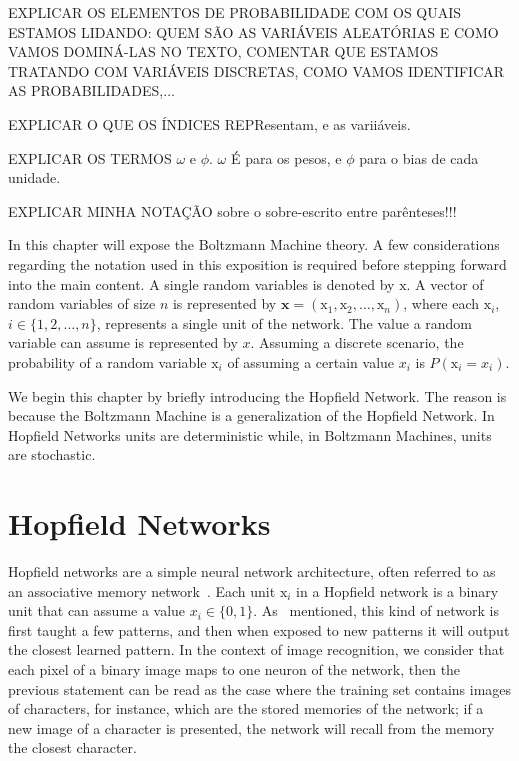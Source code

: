EXPLICAR OS ELEMENTOS DE PROBABILIDADE COM OS QUAIS ESTAMOS LIDANDO:%
QUEM S\~{A}O AS VARI\'{A}VEIS ALEAT\'{O}RIAS E COMO VAMOS DOMIN\'{A}-LAS NO TEXTO,
COMENTAR QUE ESTAMOS TRATANDO COM VARI\'{A}VEIS DISCRETAS, COMO VAMOS IDENTIFICAR AS PROBABILIDADES,$\ldots$

EXPLICAR O QUE OS \'{I}NDICES REPResentam, e as varii\'{a}veis.

EXPLICAR OS TERMOS $\omega$ e $\phi$. $\omega$ \'{E} para os pesos, e $\phi$ para o bias de cada unidade.

EXPLICAR MINHA NOTA\c{C}\~{A}O sobre o sobre-escrito entre par\^{e}nteses!!!


In this chapter will expose the Boltzmann Machine theory.
A few considerations regarding the notation used in this exposition is required before stepping forward into the main content.
A single random variables is denoted by $\mathrm{x}$.
A vector of random variables of size $n$ is represented by $\mathbf{x} = (\mathrm{x}_{1}, \mathrm{x}_{2}, \dots, \mathrm{x}_{n})$, where each $\mathrm{x}_{i}$, $i \in \{1, 2, \dots, n\}$, represents a single unit of the network.
The value a random variable can assume is represented by $x$.
Assuming a discrete scenario, the probability of a random variable $\mathrm{x}_{i}$ of assuming a certain value $x_{i}$ is $P(\mathrm{x}_{i} = x_{i})$.

We begin this chapter by briefly introducing the Hopfield Network.
The reason is because the Boltzmann Machine is a generalization of the Hopfield Network.
In Hopfield Networks units are deterministic while, in Boltzmann Machines, units are stochastic.


\section{Hopfield Networks}%
\label{ch:bm:hopfield}%

Hopfield networks are a simple neural network architecture, often referred to as an associative memory network~\cite{bib:hertz1991}.
Each unit $\mathrm{x}_{i}$ in a Hopfield network is a binary unit that can assume a value $x_{i} \in \{0, 1\}$.
As~\cite{bib:geron2017} mentioned, this kind of network is first taught a few patterns, and then when exposed to new patterns it will output the closest learned pattern.
In the context of image recognition, we consider that each pixel of a binary image maps to one neuron of the network, then the previous statement can be read as the case where the training set contains images of characters, for instance, which are the stored memories of the network; if a new image of a character is presented, the network will recall from the memory the closest character.

